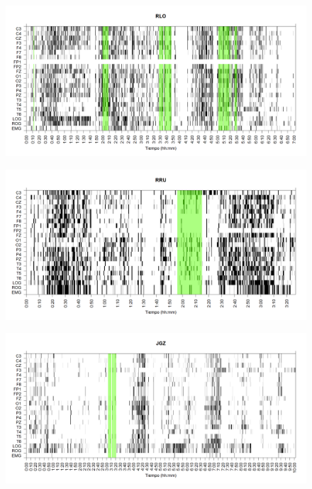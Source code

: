 \documentclass[12pt,a4paper]{mitthesis}
\begin{document}
\begin{figure}
\centering
\includegraphics[width=0.9\linewidth]
{./g170413/RLMN10SUE_est.png} 
\label{grf_RLO}
\end{figure}

\begin{figure}
\centering
\includegraphics[width=0.9\linewidth]
{./g170413/RRMNS_est.png} 
\label{grf_RRU}
\end{figure}

\begin{figure}
\centering
\includegraphics[width=0.9\linewidth]
{./g170413/JGMN6SUE_est.png} 
\label{grf_JGZ}
\end{figure}

\end{document}
